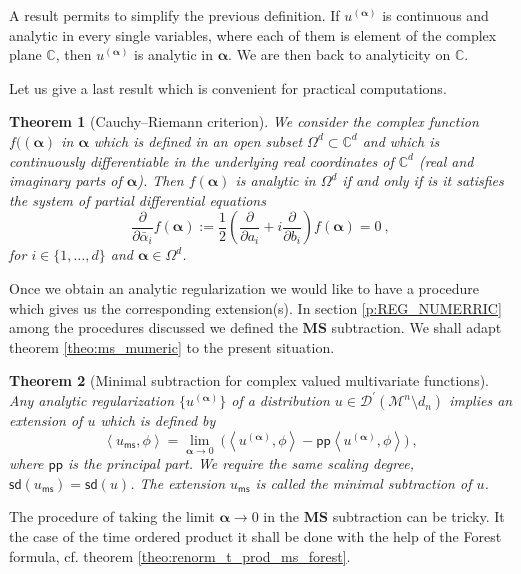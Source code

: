 \documentclass[11pt]{book}
\newcommand{\pp}{\mathsf{pp}}
\newcommand{\ms}{\mathsf{ms}}
\newcommand{\sd}{\mathsf{sd}}
\newcommand{\MS}{\textbf{MS}}
\newcommand{\alphabd}{\boldsymbol{\alpha}}
\newcommand{\sm}[1]{\left\langle#1\right\rangle}
\newcommand{\Dcal}{\mathcal{D}}
\newcommand{\Mcal}{\mathcal{M}}
\newcommand{\Cbb}{\mathbb{C}}
\theoremstyle{break}
\newtheorem{theorem}{Theorem}[chapter]
\begin{document}
A result permits to simplify the previous definition. If $u^{(\alphabd)}$ is continuous and analytic in every single variables, where each of them is element of the complex plane $\Cbb$, then $u^{(\alphabd)}$ is analytic in $\alphabd$. We are then back to analyticity on $\Cbb$.


Let us give a last result which is convenient for practical computations. 


\begin{theorem}[Cauchy--Riemann criterion]
We consider the complex function $f((\alphabd)$ in $\alphabd$ which is defined in an open subset $\Omega^d \subset \Cbb^d$ and which is continuously differentiable in the underlying real coordinates of $\Cbb^d$ (real and imaginary parts of $\alphabd$). Then $f(\alphabd)$ is analytic in $\Omega^d$ if and only if is it satisfies the system of partial differential equations
%
\begin{equation}
\frac{\partial}{\partial \bar{\alpha}_i} f(\alphabd) := \frac12 \left( \frac{\partial}{\partial a_i} + i \frac{\partial}{\partial b_i} \right) f(\alphabd) = 0 \ ,
\end{equation}
%
for $i\in\{1,\dots,d\}$ and $\alphabd\in\Omega^d$.
\end{theorem}



Once we obtain an analytic regularization we would like to have a procedure which gives us the corresponding extension(s). In section \ref{p:REG_NUMERRIC} among the procedures discussed we defined the $\MS$ subtraction. We shall adapt theorem \ref{theo:ms_mumeric} to the present situation.


\begin{theorem}[Minimal subtraction for complex valued multivariate functions]\label{theo:ms_general}
Any analytic regularization $\{u^{(\alphabd)}\}$ of a distribution $u \in \Dcal^\prime(\Mcal^n\setminus d_n)$ implies an extension of $u$ which is defined by 
%
\begin{equation*}
\sm{u_\ms,\phi} = \lim_{\alphabd \to 0} \ \bigg( \sm{u^{(\alphabd)},\phi} - \pp\sm{u^{(\alphabd)},\phi}\bigg) \ ,
\end{equation*}
%
where $\pp$ is the principal part. We require the same scaling degree, $\sd(u_\ms) = \sd(u)$. The extension $u_\ms$ is called the minimal subtraction of $u$.
\end{theorem}


The procedure of taking the limit $\alphabd \to 0$ in the $\MS$ subtraction can be tricky. It the case of the time ordered product it shall be done with the help of the Forest formula, cf. theorem \ref{theo:renorm_t_prod_ms_forest}.
\end{document}
